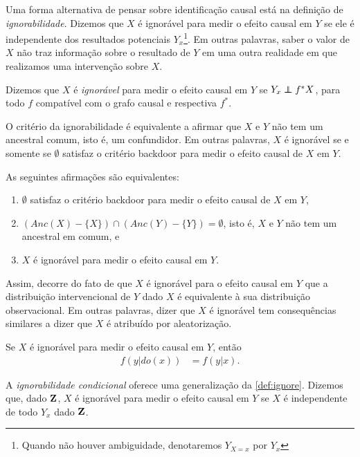 Uma forma alternativa de pensar sobre
identificação causal está
na definição de \textit{ignorabilidade}.
Dizemos que $X$ é ignorável para
medir o efeito causal em $Y$ se
ele é independente dos resultados potenciais $Y_{x}$\footnote{
Quando não houver ambiguidade, denotaremos $Y_{X=x}$ por $Y_x$}.
Em outras palavras, 
saber o valor de $X$ não traz informação sobre
o resultado de $Y$ em uma outra realidade em que
realizamos uma intervenção sobre $X$.

\begin{definition}[Ignorabilidade]
 \label{def:ignore}
 Dizemos que $X$ é \textit{ignorável} para
 medir o efeito causal em $Y$ se
 $Y_x \perp\!\!\!\!\perp{f^*} X$, 
 para todo $f$ compatível com o grafo causal e
 respectiva $f^*$.
\end{definition}

O critério da ignorabilidade é equivalente a
afirmar que $X$ e $Y$ não tem um ancestral comum, 
isto é, um confundidor.
Em outras palavras, $X$ é ignorável se
e somente se $\emptyset$ satisfaz o critério backdoor para
medir o efeito causal de $X$ em $Y$.

\begin{lemma}
 \label{lemma:ignore_backdoor}
 As seguintes afirmações são equivalentes:
 \begin{enumerate}
  \item $\emptyset$ satisfaz o critério backdoor para
  medir o efeito causal de $X$ em $Y$,
  \item $(Anc(X)-\{X\}) \cap (Anc(Y)-\{Y\}) = \emptyset$, isto é,
  $X$ e $Y$ não tem um ancestral em comum, e
  \item $X$ é ignorável para medir o efeito causal em $Y$.
 \end{enumerate}
\end{lemma}

Assim, decorre do fato de que $X$ é ignorável para 
o efeito causal em $Y$ que
a distribuição intervencional de $Y$ dado $X$ é
equivalente à sua distribuição observacional.
Em outras palavras, dizer que $X$ é ignorável tem
consequências similares a dizer que
$X$ é atribuído por aleatorização.

\begin{corollary}
 \label{cor:ignore}
 Se $X$ é ignorável para medir o efeito causal em $Y$, então
 \begin{align*}
  f(y|do(x)) &= f(y|x).
 \end{align*}
\end{corollary}

A \textit{ignorabilidade condicional} oferece
uma generalização da \cref{def:ignore}.
Dizemos que, dado ${\mathbf{Z}}$, 
$X$ é ignorável para medir o efeito causal em $Y$ se
$X$ é independente de todo $Y_x$ dado ${\mathbf{Z}}$.

